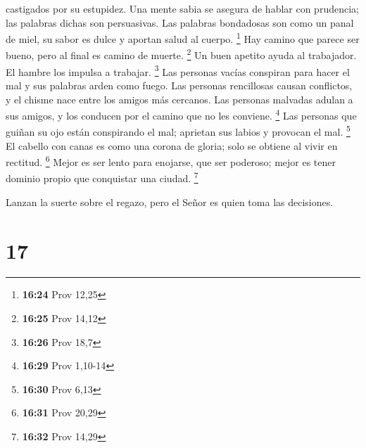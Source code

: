 castigados por su estupidez.  Una mente sabia se asegura de
hablar con prudencia; las palabras dichas son persuasivas. 
Las palabras bondadosas son como un panal de miel, su sabor es dulce y
aportan salud al cuerpo. \footnote{\textbf{16:24} Prov 12,25}
 Hay camino que parece ser bueno, pero al final es camino
de muerte. \footnote{\textbf{16:25} Prov 14,12}  Un buen
apetito ayuda al trabajador. El hambre los impulsa a trabajar.
\footnote{\textbf{16:26} Prov 18,7}  Las personas vacías
conspiran para hacer el mal y sus palabras arden como fuego.
 Las personas rencillosas causan conflictos, y el chisme
nace entre los amigos más cercanos.  Las personas malvadas
adulan a sus amigos, y los conducen por el camino que no les conviene.
\footnote{\textbf{16:29} Prov 1,10-14}  Las personas que
guiñan su ojo están conspirando el mal; aprietan sus labios y provocan
el mal. \footnote{\textbf{16:30} Prov 6,13}  El cabello con
canas es como una corona de gloria; solo se obtiene al vivir en
rectitud. \footnote{\textbf{16:31} Prov 20,29}  Mejor es
ser lento para enojarse, que ser poderoso; mejor es tener dominio propio
que conquistar una ciudad. \footnote{\textbf{16:32} Prov 14,29}

 Lanzan la suerte sobre el regazo, pero el Señor es quien
toma las decisiones.

\hypertarget{section-16}{%
\section{17}\label{section-16}}


